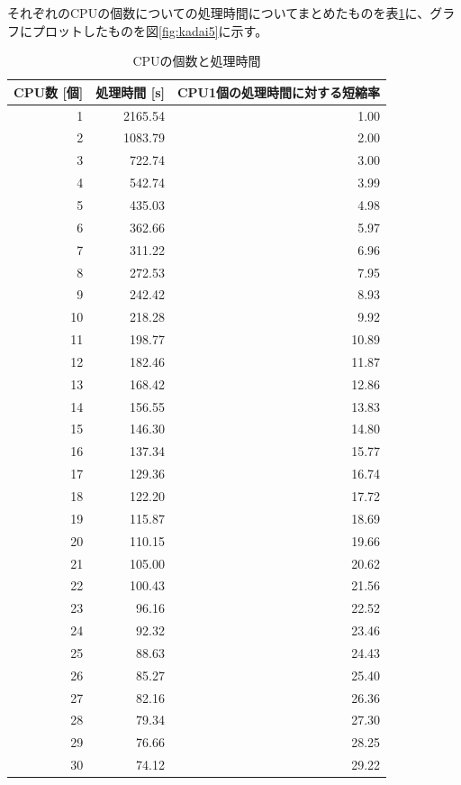 \documentclass[a4j,titlepage]{jsarticle}
\newcommand{\chuo}[1]{\multicolumn{1}{|c|}{#1}}
\begin{document}
それぞれのCPUの個数についての処理時間についてまとめたものを表\ref{tb:kadai5}に、グラフにプロットしたものを図\ref{fig:kadai5}に示す。

\begin{table}[htbp]
  \centering
  \caption{CPUの個数と処理時間}
  \label{tb:kadai5}

  \begin{tabular}{|r|r|r|}
    \hline
    \chuo{CPU数 [個]} & \chuo{処理時間 [s]} & \chuo{CPU1個の処理時間に対する短縮率} \\ \hline \hline
    1 & 2165.54 & 1.00 \\ \hline
    2 & 1083.79 & 2.00 \\ \hline
    3 & 722.74 & 3.00 \\ \hline
    4 & 542.74 & 3.99 \\ \hline
    5 & 435.03 & 4.98 \\ \hline
    6 & 362.66 & 5.97 \\ \hline
    7 & 311.22 & 6.96 \\ \hline
    8 & 272.53 & 7.95 \\ \hline
    9 & 242.42 & 8.93 \\ \hline
    10 & 218.28 & 9.92 \\ \hline
    11 & 198.77 & 10.89 \\ \hline
    12 & 182.46 & 11.87 \\ \hline
    13 & 168.42 & 12.86 \\ \hline
    14 & 156.55 & 13.83 \\ \hline
    15 & 146.30 & 14.80 \\ \hline
    16 & 137.34 & 15.77 \\ \hline
    17 & 129.36 & 16.74 \\ \hline
    18 & 122.20 & 17.72 \\ \hline
    19 & 115.87 & 18.69 \\ \hline
    20 & 110.15 & 19.66 \\ \hline
    21 & 105.00 & 20.62 \\ \hline
    22 & 100.43 & 21.56 \\ \hline
    23 & 96.16 & 22.52 \\ \hline
    24 & 92.32 & 23.46 \\ \hline
    25 & 88.63 & 24.43 \\ \hline
    26 & 85.27 & 25.40 \\ \hline
    27 & 82.16 & 26.36 \\ \hline
    28 & 79.34 & 27.30 \\ \hline
    29 & 76.66 & 28.25 \\ \hline
    30 & 74.12 & 29.22 \\ \hline
  \end{tabular}
\end{table}
\end{document}
